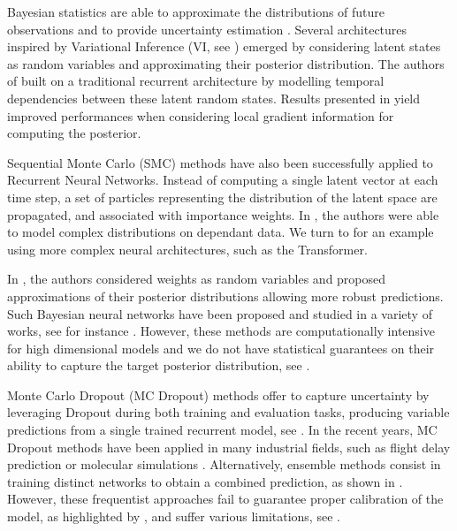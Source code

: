 \documentclass[conference]{IEEEtran}
\begin{document}
Bayesian statistics are able to approximate the distributions of future observations and to provide uncertainty estimation \cite{Hinton1995BayesianLF}.
Several architectures inspired by Variational Inference (VI, see \cite{Jordan2004AnIT}) emerged by considering latent states as random variables and approximating their posterior distribution.
The authors of \cite{10.5555/3157096.3157343} built on a traditional recurrent architecture by modelling temporal dependencies between these latent random states. Results presented in \cite{Fortunato2017bayesian} yield improved performances when considering local gradient information for computing the posterior.

Sequential Monte Carlo (SMC) methods have also been successfully applied to Recurrent Neural Networks.
Instead of computing a single latent vector at each time step, a set of particles representing the distribution of the latent space are propagated, and associated with importance weights.
In \cite{maddison2017filtering,naesseth2017variational}, the authors were able to model complex distributions on dependant data.
We turn to \cite{Martin2020TheMC} for an example using more complex neural architectures, such as the Transformer.

In \cite{Blundell2015}, the authors considered weights as random variables and proposed approximations of their posterior distributions allowing more robust predictions. Such Bayesian neural networks have been proposed and studied in a variety of works, see for instance \cite{hernandez2015probabilistic,teye2018bayesian}. However, these methods are computationally intensive for high dimensional models and we do not have statistical guarantees on their ability to capture the target  posterior distribution, see \cite{NEURIPS2020_b6dfd418}.

Monte Carlo Dropout (MC Dropout) methods offer to capture uncertainty by leveraging Dropout during both training and evaluation tasks, producing variable predictions from a single trained recurrent model, see \cite{Gal2016NIPS}.
In the recent years, MC Dropout methods have been applied in many industrial fields, such as flight delay prediction \cite{Vandal2018} or molecular simulations \cite{Wen2020UncertaintyQI}.
Alternatively, ensemble methods consist in training distinct networks to obtain a combined prediction, as shown in \cite{Pearce2018}.
However, these frequentist approaches fail to guarantee proper calibration of the model, as highlighted by \cite{ashukha2020pitfalls}, and suffer various limitations, see \cite{Fong2020}.
\end{document}
